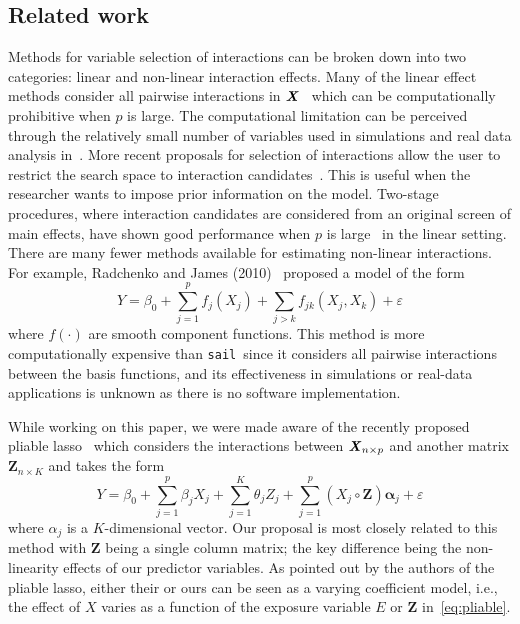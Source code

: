 \documentclass[12pt,letter]{article}\usepackage[]{graphicx}\usepackage[]{color}
\newcommand{\sail}{\texttt{sail}}
\newcommand{\bX}{\textbf{\emph{X}}}
\newcommand{\balpha}{\boldsymbol{\alpha}}
\newcommand{\mb}[1]{\mathbf{#1}}
\begin{document}
\subsection{Related work}
Methods for variable selection of interactions can be broken down into two categories: linear and non-linear interaction effects.
Many of the linear effect methods consider all pairwise interactions in $\bX$~\citep{zhao2009composite,choi2010variable,bien2013lasso, she2014group} which can be computationally prohibitive when $p$ is large. The computational limitation can be perceived through the relatively small number of variables used in simulations and real data analysis in~\citep{zhao2009composite,choi2010variable,bien2013lasso, she2014group}.
More recent proposals for selection of interactions allow the user to restrict the search space to interaction candidates~\citep{lim2015learning,haris2016convex}. This is useful when the researcher wants to impose prior information on the model.
Two-stage procedures, where interaction candidates are considered from an original screen of main effects, have shown good performance when $p$ is large~\citep{hao2018model,shah2016modelling} in the linear setting.
There are many fewer methods available for estimating non-linear interactions. For example, Radchenko and James (2010)~\citep{radchenko2010variable} proposed a model of the form
\[Y = \beta_0 + \sum_{j=1}^{p} f_j(X_j) + \sum_{j>k}f_{jk}(X_j, X_k) + \varepsilon\]
where $f(\cdot)$ are smooth component functions. This method is more computationally expensive than \sail ~since it considers all pairwise interactions between the basis functions, and its effectiveness in simulations or real-data applications is unknown as there is no software implementation.

While working on this paper, we were made aware of the recently proposed pliable lasso~\citep{tibshirani2017pliable} which considers the interactions between $\bX_{n \times p}$ and another matrix $\mathbf{Z}_{n\times K}$ and takes the form
\begin{equation}
Y = \beta_0 + \sum_{j=1}^{p}\beta_j X_j + \sum_{j=1}^{K}\theta_j Z_j + \sum_{j=1}^{p} (X_j \circ \mathbf{Z}) \balpha_j + \varepsilon \label{eq:pliable}
\end{equation}
where $\alpha_j$ is a $K$-dimensional vector.
Our proposal is most closely related to this method with $\mathbf{Z}$ being a single column matrix; the key difference being the non-linearity effects of our predictor variables.
As pointed out by the authors of the pliable lasso, either their or ours can be seen as a varying coefficient model, i.e., the effect of $X$ varies as a function of the exposure variable $E$ or $\mb{Z}$ in~\eqref{eq:pliable}.
\end{document}
